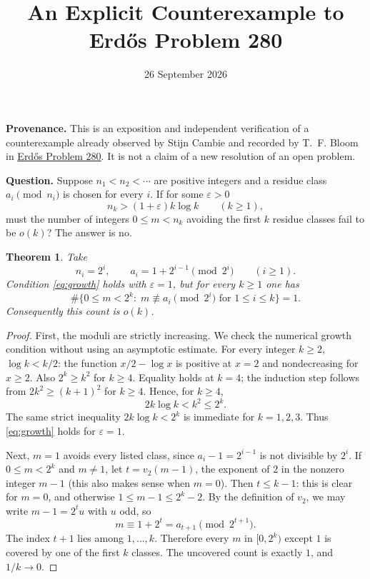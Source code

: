 \documentclass[11pt]{article}
\title{An Explicit Counterexample to Erd\H{o}s Problem 280}
\author{}
\date{26 September 2026}
\newtheorem*{theorem}{Theorem}
\begin{document}
\maketitle

\noindent\textbf{Provenance.}
This is an exposition and independent verification of a counterexample
already observed by Stijn Cambie and recorded by T.~F. Bloom in
\href{https://www.erdosproblems.com/280}{Erd\H{o}s Problem 280}.
It is not a claim of a new resolution of an open problem.

\medskip
\noindent\textbf{Question.}
Suppose $n_1<n_2<\cdots$ are positive integers and a residue class
$a_i\pmod{n_i}$ is chosen for every $i$. If for some $\varepsilon>0$
\begin{equation}\label{eq:growth}
 n_k>(1+\varepsilon)k\log k\qquad(k\geq 1),
\end{equation}
must the number of integers $0\leq m<n_k$ avoiding the first $k$
residue classes fail to be $o(k)$? The answer is no.

\begin{theorem}
Take
\[
 n_i=2^i,\qquad a_i=1+2^{i-1}\pmod{2^i}\qquad(i\geq1).
\]
Condition \eqref{eq:growth} holds with $\varepsilon=1$, but for every
$k\geq1$ one has
\[
 \#\bigl\{0\leq m<2^k:\;
       m\not\equiv a_i\pmod{2^i}\text{ for }1\leq i\leq k\bigr\}=1.
\]
Consequently this count is $o(k)$.
\end{theorem}

\begin{proof}
First, the moduli are strictly increasing. We check the numerical
growth condition without using an asymptotic estimate. For every
integer $k\geq2$, $\log k<k/2$: the function $x/2-\log x$ is positive
at $x=2$ and nondecreasing for $x\geq2$. Also $2^k\geq k^2$ for
$k\geq4$. Equality holds at $k=4$; the induction step follows from
$2k^2\geq(k+1)^2$ for $k\geq4$. Hence, for $k\geq4$,
\[
 2k\log k<k^2\leq2^k.
\]
The same strict inequality $2k\log k<2^k$ is immediate for
$k=1,2,3$. Thus \eqref{eq:growth} holds for $\varepsilon=1$.

Next, $m=1$ avoids every listed class, since
$a_i-1=2^{i-1}$ is not divisible by $2^i$.
If $0\leq m<2^k$ and $m\ne1$, let $t=v_2(m-1)$, the exponent of $2$
in the nonzero integer $m-1$ (this also makes sense when $m=0$).
Then $t\leq k-1$: this is clear for $m=0$, and otherwise
$1\leq m-1\leq2^k-2$. By the definition of $v_2$, we may write
$m-1=2^t u$ with $u$ odd, so
\[
 m\equiv1+2^t=a_{t+1}\pmod{2^{t+1}}.
\]
The index $t+1$ lies among $1,\ldots,k$. Therefore every $m$ in
$[0,2^k)$ except $1$ is covered by one of the first $k$ classes.
The uncovered count is exactly $1$, and $1/k\to0$.
\end{proof}
\end{document}
